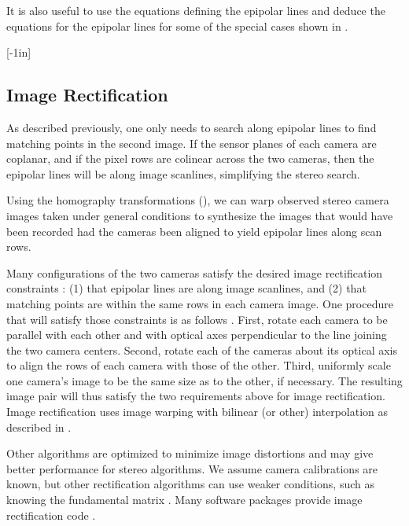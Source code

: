 It is also useful to use the equations defining the epipolar lines and deduce the equations for the epipolar lines for some of the special cases shown in \fig{\ref{fig:epipolarlinesgame}}.

[-1in]

\subsection{Image Rectification}


As described previously, one only needs to search along epipolar lines to find matching points in the second image.  If the sensor planes of each camera are coplanar, and if the pixel rows are colinear across the two cameras, then the epipolar lines will be along image scanlines, simplifying the stereo search.  


Using the homography transformations (\chap{\ref{chapter:homography}}), we can warp observed stereo camera images taken under general conditions to synthesize the images that would have been recorded had the cameras been aligned to yield epipolar lines along scan rows.


Many configurations of the two cameras satisfy the desired image rectification constraints \cite{Zhang2003}: (1) that epipolar lines are along image scanlines, and (2) that matching points are within the same rows in each camera image.  One procedure that will satisfy those constraints is as follows \cite{wikiRectification2021}.  First, rotate each camera to be parallel with each other and with optical axes perpendicular to the line joining the two camera centers.  Second, rotate each of the cameras about its optical axis to align the rows of each camera with those of the other.  Third, uniformly scale one camera's image to be the same size as to the other, if necessary.  The resulting image pair will thus satisfy the two requirements above for image rectification. Image rectification uses image warping with bilinear (or other) interpolation as described in \sect{\ref{sec:bilinearinterpolation}}.

Other algorithms are optimized to minimize image distortions \cite{Zhang2003} and may give better performance for stereo algorithms.  We assume camera calibrations are known, but other rectification algorithms can use weaker conditions, such as knowing the fundamental matrix \cite{Hartley2004,Pollefeys99}. Many software packages provide image rectification code \cite{Zhang99}.



